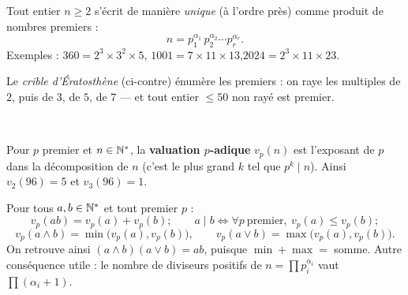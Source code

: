 \noindent
\begin{minipage}[c]{0.5\linewidth}
\begin{theoreme}
Tout entier $n\geq2$ s'écrit de manière \emph{unique} (à l'ordre près)
comme produit de nombres premiers :
\[
  n=p_1^{\alpha_1}\,p_2^{\alpha_2}\cdots p_r^{\alpha_r}.
\]
Exemples : $360=2^{3}\times3^{2}\times5$,\quad
$1001=7\times11\times13$,\quad $2024=2^{3}\times11\times23$.
\end{theoreme}
\vspace{1mm}
Le \emph{crible d'Ératosthène} (ci-contre) énumère les premiers : on raye
les multiples de $2$, puis de $3$, de $5$, de $7$ — et tout entier $\leq50$
non rayé est premier.
\end{minipage}\hfill
\begin{minipage}[c]{0.46\linewidth}
\centering
{}\\[0.5mm]
\end{minipage}


\begin{definition}
Pour $p$ premier et $n\in\mathbb{N}^{*}$, la \textbf{valuation $p$-adique}
$v_p(n)$ est l'exposant de $p$ dans la décomposition de $n$ (c'est le plus
grand $k$ tel que $p^{k}\mid n$). Ainsi $v_2(96)=5$ et $v_3(96)=1$.
\end{definition}

\begin{propriete}
Pour tous $a,b\in\mathbb{N}^{*}$ et tout premier $p$ :
\[
  v_p(ab)=v_p(a)+v_p(b) ;\qquad
  a\mid b\iff\forall p\ \text{premier},\ v_p(a)\leq v_p(b) ;
\]
\[
  v_p(a\wedge b)=\min\bigl(v_p(a),v_p(b)\bigr),\qquad
  v_p(a\vee b)=\max\bigl(v_p(a),v_p(b)\bigr).
\]
On retrouve ainsi $(a\wedge b)(a\vee b)=ab$, puisque
$\min+\max=$ somme. Autre conséquence utile : le nombre de diviseurs
positifs de $n=\prod p_i^{\alpha_i}$ vaut $\prod(\alpha_i+1)$.
\end{propriete}


